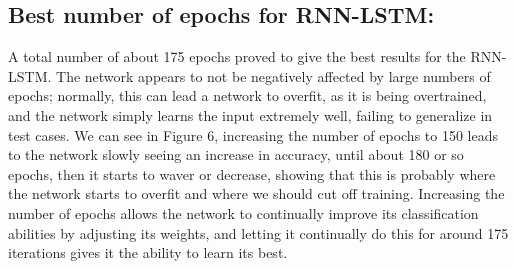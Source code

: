 \documentclass[a4paper]{article}
\begin{document}
\subsection{Best number of epochs for RNN-LSTM:}
\hspace*{10mm}A total number of about 175 epochs proved to give the best results for the RNN-LSTM. The network appears to not be negatively affected by large numbers of epochs; normally, this can lead a network to overfit, as it is being overtrained, and the network simply learns the input extremely well, failing to generalize in test cases. We can see in Figure 6, increasing the number of epochs to 150 leads to the network slowly seeing an increase in accuracy, until about 180 or so epochs, then it starts to waver or decrease, showing that this is probably where the network starts to overfit and where we should cut off training. Increasing the number of epochs allows the network to continually improve its classification abilities by adjusting its weights, and letting it continually do this for around 175 iterations gives it the ability to learn its best.
\end{document}
